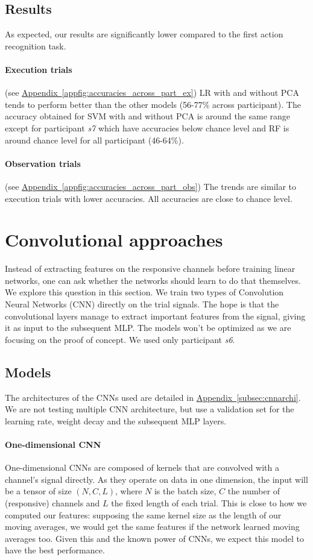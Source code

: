 \documentclass[10pt,conference,compsocconf]{IEEEtran}
\newcommand{\aref}[1]{\hyperref[#1]{Appendix~\ref*{#1}}}
\begin{document}
\subsection{Results}
As expected, our results are significantly lower compared to the first action recognition task.

\paragraph{Execution trials}
(see \aref{appfig:accuracies_across_part_ex}) LR with and without PCA tends to perform better than the other models (56-77\% across participant). The accuracy obtained for SVM with and without PCA is around the same range except for participant \textit{s7} which have accuracies below chance level and RF is around chance level for all participant (46-64\%).

\paragraph{Observation trials}
(see \aref{appfig:accuracies_across_part_obs}) The trends are similar to execution trials with lower accuracies. All accuracies are close to chance level.

\section{Convolutional approaches}
\label{sec:deeplearning}
Instead of extracting features on the responsive channels before training linear networks, one can ask whether the networks should learn to do that themselves. We explore this question in this section. We train two types of Convolution Neural Networks (CNN) directly on the trial signals. The hope is that the convolutional layers manage to extract important features from the signal, giving it as input to the subsequent MLP. The models won't be optimized as we are focusing on the proof of concept. We used only participant \textit{s6}.

\subsection{Models}

The architectures of the CNNs used are detailed in \aref{subsec:cnnarchi}. We are not testing multiple CNN architecture, but use a validation set for the learning rate, weight decay and the subsequent MLP layers.

\paragraph{One-dimensional CNN}
One-dimensional CNNs are composed of kernels that are convolved with a channel's signal directly. As they operate on data in one dimension, the input will be a tensor of size \((N, C, L)\), where \(N\) is the batch size, \(C\) the number of (responsive) channels and \(L\) the fixed length of each trial. This is close to how we computed our features: supposing the same kernel size as the length of our moving averages, we would get the same features if the network learned moving averages too. Given this and the known power of CNNs, we expect this model to have the best performance.
\end{document}
